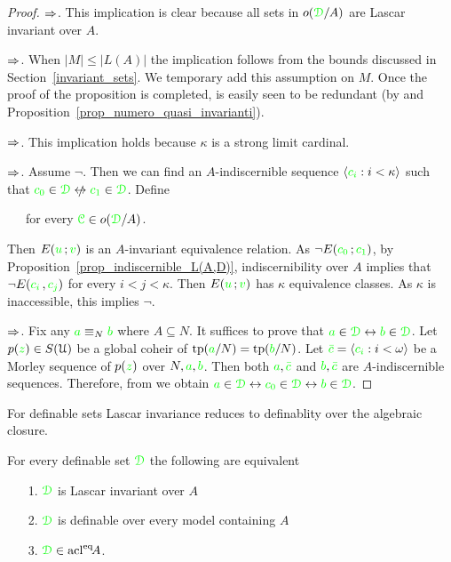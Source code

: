\begin{proof}
  $\Rightarrow$. This implication is clear because all sets in $o({\color{green}\EuScript D}/A)$ are Lascar invariant over $A$. 
  
  $\Rightarrow$. When $|M|\le|L(A)|$ the implication follows from the bounds discussed in Section~\ref{invariant_sets}.
We temporary add this assumption on $M$.
Once the proof of the proposition is completed, is easily seen to be redundant (by  and Proposition~\ref{prop_numero_quasi_invarianti}). 
  
  $\Rightarrow$. This implication holds because $\kappa$ is a strong limit cardinal.

  $\Rightarrow$. Assume $\neg$.
Then we can find an $A\mbox{-}$indiscernible sequence $\langle{\color{green}c_i}:i<\kappa\rangle$ such that ${\gr c_0}\in\grD\niff {\gr c_1}\in\grD$.
Define

  \ \ \ for every ${\color{green}\EuScript C}\in o({\color{green}\EuScript D}/A)$.

  Then $E({\color{green} u}\,;{\color{green} v})$ is an $A\mbox{-}$invariant equivalence relation.
As $\neg E({\color{green} c_0}\,;{\color{green} c_1})$, by Proposition~\ref{prop_indiscernible_L(A,D)}, indiscernibility over $A$ implies that $\neg E({\color{green} c_i\,},{\color{green} c_j})$ for every $i<j<\kappa$.
Then $E({\color{green} u}\,;{\color{green} v})$ has $\kappa$ equivalence classes.
As $\kappa$ is inaccessible, this implies $\neg$.

  $\Rightarrow$. Fix any ${\color{green} a}\equiv_N{\color{green} b}$ where $A\subseteq N$.
It suffices to prove that ${\color{green} a}\in{\color{green}\EuScript D}\leftrightarrow{\color{green}b}\in{\color{green}\EuScript D}$.
Let $p({\color{green} z})\in S(\EuScript U)$ be a global coheir of ${\rm tp}({\color{green} a}/N)={\rm tp}({\color{green} b}/N)$.
Let ${\color{green}\bar c}=\langle{\color{green}c_i}:i<\omega\rangle$ be a Morley sequence of $p({\color{green} z})$ over $N,{\color{green} a},{\color{green} b}$.
Then both ${\color{green} a},{\color{green}\bar c}$ and ${\color{green} b},{\color{green}\bar c}$ are $A\mbox{-}$indiscernible sequences.
Therefore, from  we obtain ${\color{green} a}\in{\color{green}\EuScript D}\leftrightarrow{\color{green}c_0}\in{\color{green}\EuScript D}\leftrightarrow{\color{green}b}\in{\color{green}\EuScript D}$. 
\end{proof}

For definable sets Lascar invariance reduces to definablity over the algebraic closure.

\begin{corollary}\label{coroll_defble_Lascar_inv}
For every definable set ${\color{green}\EuScript D}$ the following are equivalent
  \begin{itemize}
    \item[1.] ${\color{green}\EuScript D}$ is Lascar invariant over $A$
    \item[2.] ${\color{green}\EuScript D}$ is definable over every model containing $A$
    \item[3.] ${\color{green}\EuScript D}\in{\rm acl}^{{\rm eq}}\!A$.
  \end{itemize}
\end{corollary}

